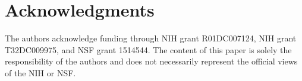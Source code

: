 \documentclass[preprint]{JASAnew}\usepackage[]{graphicx}\usepackage[]{color}
\begin{document}
\section{Acknowledgments} 

The authors acknowledge funding through NIH grant R01DC007124, NIH grant T32DC009975, and NSF grant 1514544. The content of this paper is solely the responsibility of the authors and does not necessarily represent the official views of the NIH or NSF.


\end{document}
